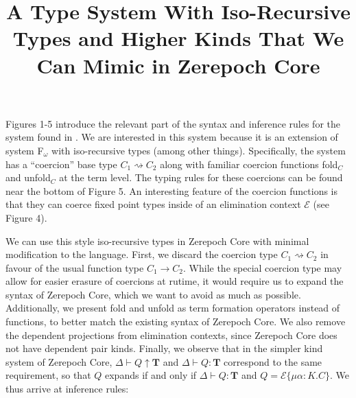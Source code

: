 \documentclass{article}
\title{A Type System With Iso-Recursive Types and Higher Kinds That We Can Mimic in Zerepoch Core}
\renewcommand{\:}{\mathbin{:}}
\begin{document}
\maketitle

Figures 1-5 introduce the relevant part of the syntax and inference rules for the system found in \cite{Dreyer05}. We are interested in this system because it is an extension of system F$_\omega$ with iso-recursive types (among other things). Specifically, the system has a ``coercion'' base type $C_1 \rightsquigarrow C_2$ along with familiar coercion functions {\sf fold}$_C$ and {\sf unfold}$_C$ at the term level. The typing rules for these coercions can be found near the bottom of Figure 5. An interesting feature of the coercion functions is that they can coerce fixed point types inside of an elimination context $\mathcal{E}$ (see Figure 4).

We can use this style iso-recursive types in Zerepoch Core with minimal modification to the language. First, we discard the coercion type $C_1 \rightsquigarrow C_2$ in favour of the usual function type $C_1 \longrightarrow C_2$. While the special coercion type may allow for easier erasure of coercions at rutime, it would require us to expand the syntax of Zerepoch Core, which we want to avoid as much as possible. Additionally, we present {\sf fold} and {\sf unfold} as term formation operators instead of functions, to better match the existing syntax of Zerepoch Core. We also remove the dependent projections from elimination contexts, since Zerepoch Core does not have dependent pair kinds. Finally, we observe that in the simpler kind system of Zerepoch Core, $\Delta \vdash Q \uparrow \textbf{T}$ and $\Delta \vdash Q \: \textbf{T}$ correspond to the same requirement, so that $Q$ expands if and only if $\Delta \vdash Q \: \textbf{T}$ and $Q = \mathcal{E}\{\mu\alpha\: K.C\}$. We thus arrive at inference rules:

\end{document}
